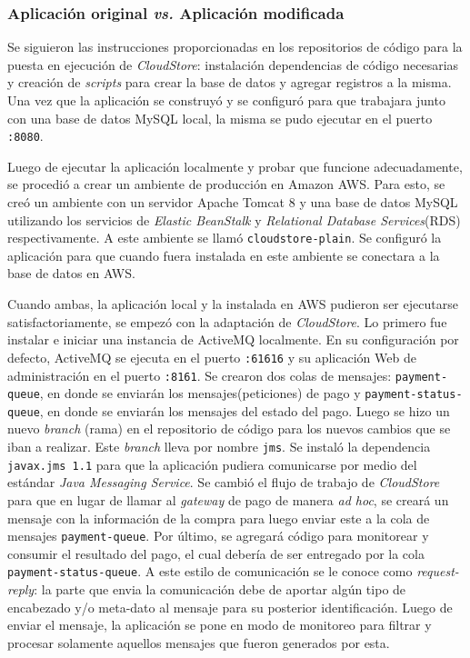 \documentclass[conference]{IEEEtran}
\begin{document}
\subsubsection{Aplicación original \emph{vs.} Aplicación modificada}
Se siguieron las instrucciones proporcionadas en los repositorios de código para la puesta en ejecución de \emph{CloudStore}: instalación dependencias de código necesarias y creación de \emph{scripts} para crear la base de datos y agregar registros a la misma. Una vez que la aplicación se construyó y se configuró para que trabajara junto con una base de datos MySQL local, la misma se pudo ejecutar en el puerto \texttt{:8080}.

Luego de ejecutar la aplicación localmente y probar que funcione adecuadamente, se procedió a crear un ambiente de producción en Amazon AWS. Para esto, se creó un ambiente con un servidor Apache Tomcat 8 y una base de datos MySQL utilizando los servicios de \emph{Elastic BeanStalk} y \emph{Relational Database Services}(RDS) respectivamente. A este ambiente se llamó \texttt{cloudstore-plain}. Se configuró la aplicación para que cuando fuera instalada en este ambiente se conectara a la base de datos en AWS.

Cuando ambas, la aplicación local y la instalada en AWS pudieron ser ejecutarse satisfactoriamente, se empezó con la adaptación de \emph{CloudStore}. Lo primero fue instalar e iniciar una instancia de ActiveMQ localmente. En su configuración por defecto, ActiveMQ se ejecuta en el puerto \texttt{:61616} y su aplicación Web de administración en el puerto \texttt{:8161}. Se crearon dos colas de mensajes: \texttt{payment-queue}, en donde se enviarán los mensajes(peticiones) de pago y \texttt{payment-status-queue}, en donde se enviarán los mensajes del estado del pago.  Luego se hizo un nuevo \emph{branch} (rama) en el repositorio de código para los nuevos cambios que se iban a realizar. Este \emph{branch} lleva por nombre \texttt{jms}. Se instaló la dependencia \texttt{javax.jms 1.1} para que la aplicación pudiera comunicarse por medio del estándar \emph{Java Messaging Service}. Se cambió el flujo de trabajo de \emph{CloudStore} para que en lugar de llamar al \emph{gateway} de pago de manera \emph{ad hoc}, se creará un mensaje con la información de la compra para luego enviar este a la cola de mensajes \texttt{payment-queue}. Por último, se agregará código para monitorear y consumir el resultado del pago, el cual debería de ser entregado por la cola \texttt{payment-status-queue}. A este estilo de comunicación se le conoce como \emph{request-reply}: la parte que envia la comunicación debe de aportar algún tipo de encabezado y/o meta-dato al mensaje para su posterior identificación. Luego de enviar el mensaje, la aplicación se pone en modo de monitoreo para filtrar y procesar solamente aquellos mensajes que fueron generados por esta.
\end{document}
